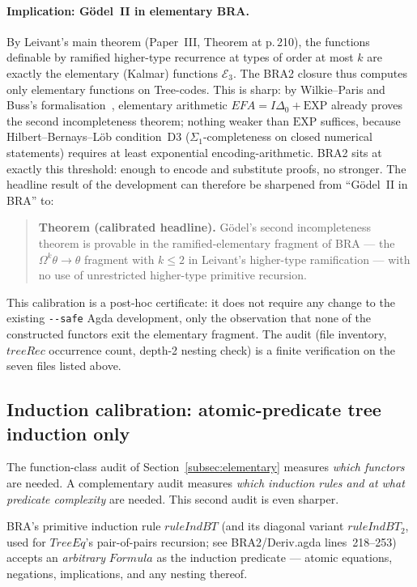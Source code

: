 \documentclass[11pt]{article}
\begin{document}
\paragraph{Implication: G\"odel~II in elementary BRA.}
By Leivant's main theorem (Paper~III, Theorem at p.\,210), the
functions definable by ramified higher-type recurrence at types of
order at most $k$ are exactly the elementary (Kalmar) functions
$\mathcal{E}_3$.  The BRA2 closure thus computes only elementary
functions on Tree-codes.  This is sharp: by Wilkie--Paris and Buss's
formalisation~\cite{wilkieparis1987}, elementary arithmetic
$\mathit{EFA} = I\Delta_0 + \mathrm{EXP}$ already proves the second
incompleteness theorem; nothing weaker than $\mathrm{EXP}$ suffices,
because Hilbert--Bernays--L\"ob condition~D3 ($\Sigma_1$-completeness
on closed numerical statements) requires at least exponential
encoding-arithmetic.  BRA2 sits at exactly this threshold: enough to
encode and substitute proofs, no stronger.  The headline result of
the development can therefore be sharpened from ``G\"odel~II in BRA''
to:
\begin{quote}
\textbf{Theorem (calibrated headline).}  G\"odel's second
incompleteness theorem is provable in the ramified-elementary
fragment of BRA --- the $\Omega^k\theta \to \theta$ fragment with
$k \le 2$ in Leivant's higher-type ramification --- with no use of
unrestricted higher-type primitive recursion.
\end{quote}
This calibration is a post-hoc certificate: it does not require any
change to the existing \verb|--safe| Agda development, only the
observation that none of the constructed functors exit the elementary
fragment.  The audit (file inventory, $\mathit{treeRec}$ occurrence
count, depth-2 nesting check) is a finite verification on the seven
files listed above.

\subsection{Induction calibration: atomic-predicate tree induction only}
\label{subsec:atomic-ind}

The function-class audit of Section~\ref{subsec:elementary} measures
\emph{which functors} are needed.  A complementary audit measures
\emph{which induction rules and at what predicate complexity} are
needed.  This second audit is even sharper.

BRA's primitive induction rule
$\mathit{ruleIndBT}$ (and its diagonal variant
$\mathit{ruleIndBT}_2$, used for $\mathit{TreeEq}$'s pair-of-pairs
recursion; see BRA2/Deriv.agda lines~218--253) accepts an
\emph{arbitrary} $\mathit{Formula}$ as the induction predicate ---
atomic equations, negations, implications, and any nesting thereof.
\end{document}
